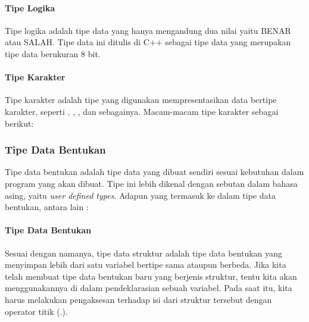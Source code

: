 \documentclass[../main.tex]{subfiles}
\begin{document}
    \paragraph{Tipe Logika}
    \begin{indentlevel1}
        Tipe logika adalah tipe data yang hanya mengandung dua nilai yaitu BENAR atau SALAH. Tipe data ini ditulis di C++ sebagai tipe data  yang merupakan tipe data berukuran 8 bit.
    \end{indentlevel1}

    \paragraph{Tipe Karakter}
    \begin{indentlevel1}
        Tipe karakter adalah tipe yang digunakan mempresentasikan data bertipe karakter, seperti , , ,  dan sebagainya. Macam-macam tipe karakter sebagai berikut:
    \end{indentlevel1}


    \subsubsection{Tipe Data Bentukan}
    \begin{indentlevel0}
        Tipe data bentukan adalah tipe data yang dibuat sendiri sesuai kebutuhan dalam program yang akan dibuat. Tipe ini lebih dikenal dengan sebutan dalam bahasa asing, yaitu \textit{user defined types}. Adapun yang termasuk ke dalam tipe data bentukan, antara lain \parencite{friyadi2005panduan}:
    \end{indentlevel0}

    \paragraph{Tipe Data Bentukan}
    \begin{indentlevel1}
        Sesuai dengan namanya, tipe data struktur adalah tipe data bentukan yang menyimpan lebih dari satu variabel bertipe sama ataupun berbeda. Jika kita telah membuat tipe data bentukan baru yang berjenis struktur, tentu kita akan menggunakannya di dalam pendeklarasian sebuah variabel. Pada saat itu, kita harus melakukan pengaksesan terhadap isi dari struktur tersebut dengan operator titik (.).
    \end{indentlevel1}
\end{document}

